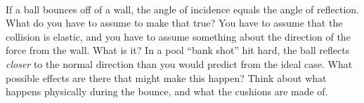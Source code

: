 \documentclass[12pt]{article}
\newcounter{problem}
\begin{document}
\paragraph{\theproblem}%
If a ball bounces off of a wall, the angle of incidence equals the
angle of reflection.  What do you have to assume to make that true?
You have to assume that the collision is elastic, and you have to
assume something about the direction of the force from the wall.  What
is it?  In a pool ``bank shot'' hit hard, the ball reflects
\emph{closer} to the normal direction than you would predict from the
ideal case.  What possible effects are there that might make this
happen?  Think about what happens physically during the bounce, and
what the cushions are made of.
\end{document}
